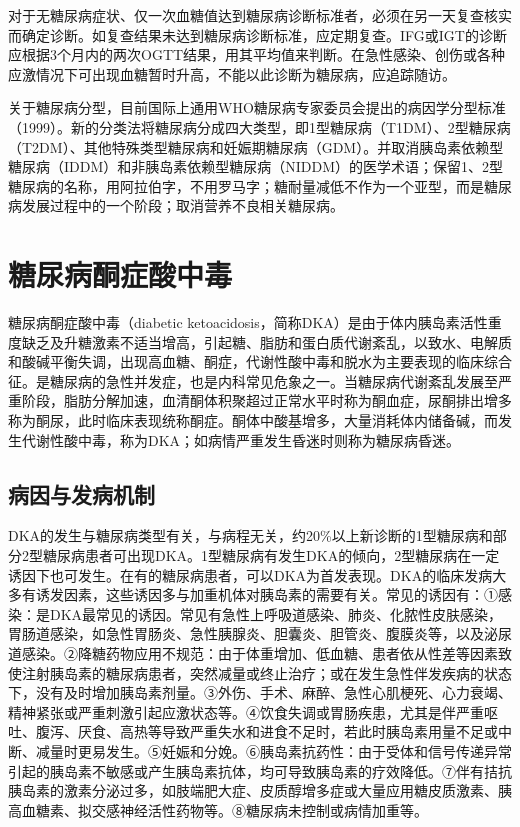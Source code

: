 对于无糖尿病症状、仅一次血糖值达到糖尿病诊断标准者，必须在另一天复查核实而确定诊断。如复查结果未达到糖尿病诊断标准，应定期复查。IFG或IGT的诊断应根据3个月内的两次OGTT结果，用其平均值来判断。在急性感染、创伤或各种应激情况下可出现血糖暂时升高，不能以此诊断为糖尿病，应追踪随访。

关于糖尿病分型，目前国际上通用WHO糖尿病专家委员会提出的病因学分型标准（1999）。新的分类法将糖尿病分成四大类型，即1型糖尿病（T1DM）、2型糖尿病（T2DM）、其他特殊类型糖尿病和妊娠期糖尿病（GDM）。并取消胰岛素依赖型糖尿病（IDDM）和非胰岛素依赖型糖尿病（NIDDM）的医学术语；保留1、2型糖尿病的名称，用阿拉伯字，不用罗马字；糖耐量减低不作为一个亚型，而是糖尿病发展过程中的一个阶段；取消营养不良相关糖尿病。

\section{糖尿病酮症酸中毒}

糖尿病酮症酸中毒（diabetic
ketoacidosis，简称DKA）是由于体内胰岛素活性重度缺乏及升糖激素不适当增高，引起糖、脂肪和蛋白质代谢紊乱，以致水、电解质和酸碱平衡失调，出现高血糖、酮症，代谢性酸中毒和脱水为主要表现的临床综合征。是糖尿病的急性并发症，也是内科常见危象之一。当糖尿病代谢紊乱发展至严重阶段，脂肪分解加速，血清酮体积聚超过正常水平时称为酮血症，尿酮排出增多称为酮尿，此时临床表现统称酮症。酮体中酸基增多，大量消耗体内储备碱，而发生代谢性酸中毒，称为DKA；如病情严重发生昏迷时则称为糖尿病昏迷。

\subsection{病因与发病机制}

DKA的发生与糖尿病类型有关，与病程无关，约20\%以上新诊断的1型糖尿病和部分2型糖尿病患者可出现DKA。1型糖尿病有发生DKA的倾向，2型糖尿病在一定诱因下也可发生。在有的糖尿病患者，可以DKA为首发表现。DKA的临床发病大多有诱发因素，这些诱因多与加重机体对胰岛素的需要有关。常见的诱因有：①感染：是DKA最常见的诱因。常见有急性上呼吸道感染、肺炎、化脓性皮肤感染，胃肠道感染，如急性胃肠炎、急性胰腺炎、胆囊炎、胆管炎、腹膜炎等，以及泌尿道感染。②降糖药物应用不规范：由于体重增加、低血糖、患者依从性差等因素致使注射胰岛素的糖尿病患者，突然减量或终止治疗；或在发生急性伴发疾病的状态下，没有及时增加胰岛素剂量。③外伤、手术、麻醉、急性心肌梗死、心力衰竭、精神紧张或严重刺激引起应激状态等。④饮食失调或胃肠疾患，尤其是伴严重呕吐、腹泻、厌食、高热等导致严重失水和进食不足时，若此时胰岛素用量不足或中断、减量时更易发生。⑤妊娠和分娩。⑥胰岛素抗药性：由于受体和信号传递异常引起的胰岛素不敏感或产生胰岛素抗体，均可导致胰岛素的疗效降低。⑦伴有拮抗胰岛素的激素分泌过多，如肢端肥大症、皮质醇增多症或大量应用糖皮质激素、胰高血糖素、拟交感神经活性药物等。⑧糖尿病未控制或病情加重等。

